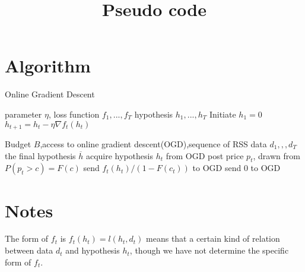 \documentclass{article}
\begin{document}
\title{Pseudo code}
\maketitle
\section{Algorithm}
\begin{algorithm}
\label{alg:ogd}
\caption{Online Gradient Descent}
\begin{algorithmic}[1]
\Require parameter $\eta$, loss function $f_1,...,f_T$
\Ensure hypothesis $h_1,...,h_T$
\State Initiate $h_1=0$
\State $h_{t+1}=h_{t}-\eta \nabla f_t(h_t)$
\EndFor
\end{algorithmic}
\end{algorithm}


\begin{algorithm}
\label{alg:main}
\caption{}
\begin{algorithmic}[1]
\Require Budget $B$,access to online gradient descent(OGD),sequence of RSS data $d_1,,,d_T$
\Ensure the final hypothesis $\overline{h}$
\State acquire hypothesis $h_t$ from OGD
\State post price $p_t$, drawn from $P(p_t>c)=F(c)$
\State send $f_t(h_t)/(1-F(c_t))$ to OGD
\Else
\State send $0$ to OGD
\EndIf 
\EndFor
\end{algorithmic}
\end{algorithm}
\section{Notes}
The form of $f_t$ is $f_t(h_t)=l(h_t,d_t)$ means that a certain kind of relation between data $d_t$ and hypothesis $h_t$, though we have not determine the specific form of $f_t$.
\end{document}
